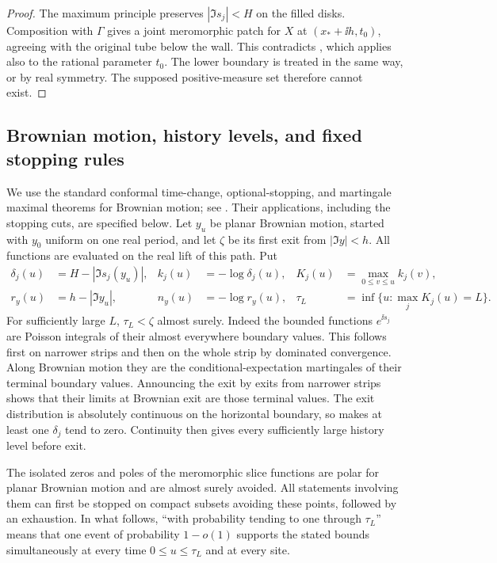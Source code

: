\begin{proof}
The maximum principle preserves \(|\Im s_j|<H\) on the filled disks.
Composition with \(\Gamma\) gives a joint meromorphic patch for \(X\) at
\((x_*+\ii h,t_0)\), agreeing with the original tube below the wall.
This contradicts , which applies also to the rational
parameter \(t_0\).  The lower boundary is treated in the same way, or by
real symmetry.  The supposed positive-measure set therefore cannot exist.
\end{proof}

\subsection{Brownian motion, history levels, and fixed stopping rules}

We use the standard conformal time-change, optional-stopping, and
martingale maximal theorems for Brownian motion; see
\cite[Chapters~II, IV and V]{RevuzYor1999}. Their applications, including the stopping cuts,
are specified below.
Let \(y_u\) be planar Brownian motion, started with \(y_0\) uniform on one
real period, and let \(\zeta\) be its first exit from \(|\Im y|<h\).
All functions are evaluated on the real lift of this path.  Put
\begin{equation}
 \begin{aligned}
 \delta_j(u)&=H-|\Im s_j(y_u)|,&
 k_j(u)&=-\log\delta_j(u),&
 K_j(u)&=\max_{0\le v\le u}k_j(v),\\
 r_y(u)&=h-|\Im y_u|,&
 n_y(u)&=-\log r_y(u),&
 \tau_L&=\inf\{u:\max_jK_j(u)=L\}.
 \end{aligned}
 \label{odd:stopping-data}
\end{equation}
For sufficiently large \(L\), \(\tau_L<\zeta\) almost surely.  Indeed the
bounded functions \(e^{\ii s_j}\) are Poisson integrals of their almost
everywhere boundary values.  This follows first on narrower strips and
then on the whole strip by dominated convergence.  Along Brownian motion
they are the conditional-expectation martingales of their terminal boundary
values.  Announcing the exit by exits from narrower strips shows that their
limits at Brownian exit are those terminal values.  The exit distribution
is absolutely continuous on the horizontal boundary, so
 makes at least one \(\delta_j\) tend to zero.
Continuity then gives every sufficiently large history level before exit.

The isolated zeros and poles of the meromorphic slice functions are polar
for planar Brownian motion and are almost surely avoided.  All statements
involving them can first be stopped on compact subsets avoiding these
points, followed by an exhaustion.  In what follows, ``with probability
tending to one through \(\tau_L\)'' means that one event of probability
\(1-o(1)\) supports the stated bounds simultaneously at every time
\(0\le u\le\tau_L\) and at every site.

